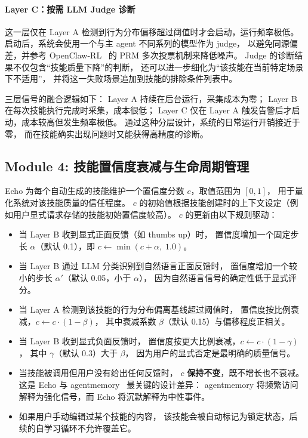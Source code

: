 \documentclass[12pt,a4paper]{article}
\begin{document}
	\paragraph{Layer C：按需 LLM Judge 诊断}
	这一层仅在 Layer A 检测到行为分布偏移超过阈值时才会启动，运行频率极低。
	启动后，系统会使用一个与主 agent 不同系列的模型作为 judge，
	以避免同源偏差，并参考 OpenClaw-RL~\cite{openclaw_rl} 的 PRM 多次投票机制来降低噪声。
	Judge 的诊断结果不仅包含``技能质量下降''的判断，
	还可以进一步细化为``该技能在当前特定场景下不适用''，
	并将这一失败场景追加到技能的排除条件列表中。
	
	三层信号的融合逻辑如下：
	Layer A 持续在后台运行，采集成本为零；
	Layer B 在每次技能执行完成时采集，成本很低；
	Layer C 仅在 Layer A 触发告警后才启动，成本较高但发生频率极低。
	通过这种分层设计，系统的日常运行开销接近于零，
	而在技能确实出现问题时又能获得高精度的诊断。
	
	\subsection{Module 4: 技能置信度衰减与生命周期管理}
	
	Echo 为每个自动生成的技能维护一个置信度分数 $c$，取值范围为 $[0, 1]$，
	用于量化系统对该技能质量的信任程度。
	$c$ 的初始值根据技能创建时的上下文设定（例如用户显式请求存储的技能初始置信度较高）。
	$c$ 的更新由以下规则驱动：
	
	\begin{itemize}[nosep]
		\item 当 Layer B 收到显式正面反馈（如 thumbs up）时，
		置信度增加一个固定步长 $\alpha$（默认 0.1），即 $c \leftarrow \min(c + \alpha,\; 1.0)$。
		\item 当 Layer B 通过 LLM 分类识别到自然语言正面反馈时，
		置信度增加一个较小的步长 $\alpha'$（默认 0.05，小于 $\alpha$），
		因为自然语言信号的确定性低于显式评分。
		\item 当 Layer A 检测到该技能的行为分布偏离基线超过阈值时，
		置信度按比例衰减，$c \leftarrow c \cdot (1 - \beta)$，
		其中衰减系数 $\beta$（默认 0.15）与偏移程度正相关。
		\item 当 Layer B 收到显式负面反馈时，
		置信度按更大比例衰减，$c \leftarrow c \cdot (1 - \gamma)$，
		其中 $\gamma$（默认 0.3）大于 $\beta$，
		因为用户的显式否定是最明确的质量信号。
		\item 当技能被调用但用户没有给出任何反馈时，
		$c$ \textbf{保持不变}，既不增长也不衰减。
		这是 Echo 与 agentmemory~\cite{agentmemory} 最关键的设计差异：
		agentmemory 将频繁访问解释为强化信号，而 Echo 将沉默解释为中性事件。
		\item 如果用户手动编辑过某个技能的内容，
		该技能会被自动标记为锁定状态，后续的自学习循环不允许覆盖它。
	\end{itemize}
	
\end{document}
